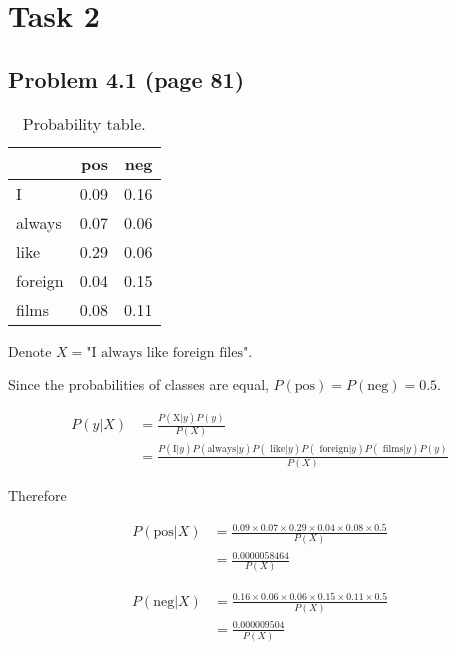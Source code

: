 \section{Task 2}
\subsection{Problem 4.1 (page 81)}
\begin{table}[h!]
    \centering
    \begin{tabular}{l|r|r}
    & pos & neg \\
    \hline
         I & 0.09 &0.16 \\
        always &0.07& 0.06 \\
        like& 0.29 &0.06 \\
        foreign &0.04 & 0.15 \\
        films & 0.08 & 0.11 \\
    \end{tabular}
    \caption{Probability table.}
    \label{tab:my_label}
    
\end{table}

Denote $X=\text{"I always like foreign files"}$.

Since the probabilities of classes are equal, $P(\text{pos}) =P(\text{neg}) =0.5 $.

\begin{equation*}
\begin{aligned}
P(y|X) &= \frac{P(\text{X}|y)P(y)}{P(X)}\\
&= \frac{P(\text{I}|y) P(\text{always}|y) P(\text{ like}|y) P(\text{ foreign}|y) P(\text{ films}|y)P(y)}{P(X)}
\end{aligned}
\end{equation*}

Therefore


\begin{equation*}
\begin{aligned}
P(\text{pos}| X) &= \frac{0.09 \times 0.07 \times 0.29 \times 0.04 \times 0.08\times 0.5}{P(X)} \\
&= \frac{0.0000058464}{P(X)}
\end{aligned}
\end{equation*}

\begin{equation*}
\begin{aligned}
P(\text{neg}| X) &= \frac{0.16 \times 0.06 \times 0.06 \times 0.15 \times 0.11\times 0.5}{P(X)} \\
&= \frac{0.000009504}{P(X)}
\end{aligned}
\end{equation*}

